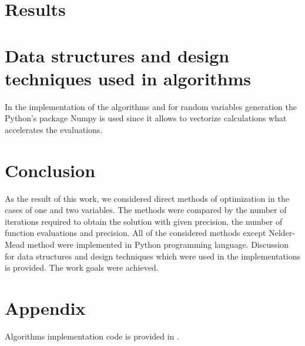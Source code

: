 \documentclass[12pt, bachelor, substylefile = algo_title.rtx]{disser}
\theoremstyle{definition}
\begin{document}
\section{Results}

\section{Data structures and design techniques used in algorithms}


In the implementation of the algorithms and for random variables generation the Python's package Numpy is used since it allows to vectorize calculations what accelerates the evaluations.


\section{Conclusion}
As the result of this work, we considered direct methods of optimization in the cases of one and two variables. The methods were compared by the number of iterations required to obtain the solution with given precision, the number of function evaluations and precision. All of the considered methods except Nelder-Mead method were implemented in Python programming language.
Discussion for data structures and design techniques which were used in the implementations is provided. The work goals were achieved.

\section{Appendix}
Algorithms implementation code is provided in \cite{repogithub}.

{\small }

\end{document}
